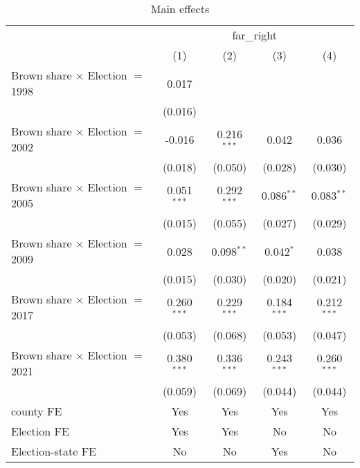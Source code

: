 
\begin{table}[htbp]
   \caption{Main effects}
   \centering
   \begin{tabular}{lcccc}
      \tabularnewline \midrule \midrule
       & \multicolumn{4}{c}{far\_right}\\
                                              & (1)           & (2)           & (3)           & (4)\\  
      Brown share $\times$ Election $=$ 1998  & 0.017         &               &               &   \\   
                                              & (0.016)       &               &               &   \\   
      Brown share $\times$ Election $=$ 2002  & -0.016        & 0.216$^{***}$ & 0.042         & 0.036\\   
                                              & (0.018)       & (0.050)       & (0.028)       & (0.030)\\   
      Brown share $\times$ Election $=$ 2005  & 0.051$^{***}$ & 0.292$^{***}$ & 0.086$^{**}$  & 0.083$^{**}$\\   
                                              & (0.015)       & (0.055)       & (0.027)       & (0.029)\\   
      Brown share $\times$ Election $=$ 2009  & 0.028         & 0.098$^{**}$  & 0.042$^{*}$   & 0.038\\   
                                              & (0.015)       & (0.030)       & (0.020)       & (0.021)\\   
      Brown share $\times$ Election $=$ 2017  & 0.260$^{***}$ & 0.229$^{***}$ & 0.184$^{***}$ & 0.212$^{***}$\\   
                                              & (0.053)       & (0.068)       & (0.053)       & (0.047)\\   
      Brown share $\times$ Election $=$ 2021  & 0.380$^{***}$ & 0.336$^{***}$ & 0.243$^{***}$ & 0.260$^{***}$\\   
                                              & (0.059)       & (0.069)       & (0.044)       & (0.044)\\   
      county FE                               & Yes           & Yes           & Yes           & Yes\\  
      Election FE                             & Yes           & Yes           & No            & No\\  
      Election-state FE                       & No            & No            & Yes           & No\\  

\end{tabular}
\end{table}
